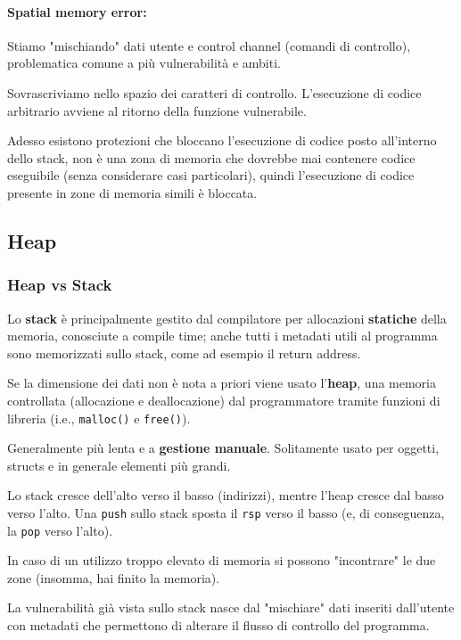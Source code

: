 \paragraph{Spatial memory error:} Stiamo "mischiando" dati utente e control channel (comandi di controllo), problematica comune a più vulnerabilità e ambiti. 

Sovrascriviamo nello spazio dei caratteri di controllo. L'esecuzione di codice arbitrario avviene al ritorno della funzione vulnerabile.

Adesso esistono protezioni che bloccano l'esecuzione di codice posto all'interno dello stack, non è una zona di memoria che dovrebbe mai contenere codice eseguibile (senza considerare casi particolari), quindi l'esecuzione di codice presente in zone di memoria simili è bloccata.


\subsection{Heap}

\subsubsection{Heap vs Stack}

Lo \textbf{stack} è principalmente gestito dal compilatore per allocazioni \textbf{statiche} della memoria, conosciute a compile time; anche tutti i metadati utili al programma sono memorizzati sullo stack, come ad esempio il return address. 

Se la dimensione dei dati non è nota a priori viene usato l'\textbf{heap}, una memoria controllata (allocazione e deallocazione) dal programmatore tramite funzioni di libreria (i.e., \texttt{malloc()} e \texttt{free()}). 

Generalmente più lenta e a \textbf{gestione manuale}. Solitamente usato per oggetti, structs e in generale elementi più grandi.

Lo stack cresce dell'alto verso il basso (indirizzi), mentre l'heap cresce dal basso verso l'alto. Una \texttt{push} sullo stack sposta il \texttt{rsp} verso il basso (e, di conseguenza, la \texttt{pop} verso l'alto).

In caso di un utilizzo troppo elevato di memoria si possono "incontrare" le due zone (insomma, hai finito la memoria).

La vulnerabilità già vista sullo stack nasce dal "mischiare" dati inseriti dall'utente con metadati che permettono di alterare il flusso di controllo del programma.

